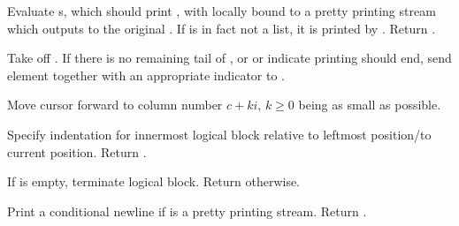\begin{LIST}{1cm}
  {
  Evaluate s, which should print , with
   locally bound to a pretty 
  printing stream which outputs to the original . If
   is in fact not a list, it is printed by
  . Return \retval{\NIL}.
  }

  \begin{LIST}{.5cm}

    {
    Take  off . If there is no remaining
    tail of , or  or  indicate
    printing should end, send element together with an appropriate
    indicator to . 
  }

    {
    Move cursor forward to column number $c + ki$, $k \geq 0$ being as small
    as possible.
  }

    {
    Specify indentation for innermost logical block relative to
    leftmost position/to current position. Return \retval{\NIL}.
  }

    {
    If  is empty, terminate logical block. Return
    \retval{\NIL} otherwise.
  }
    
  \end{LIST}

  {
  Print a conditional newline if  is a pretty printing
  stream. Return \retval{\NIL}. 
  }


\end{LIST}
